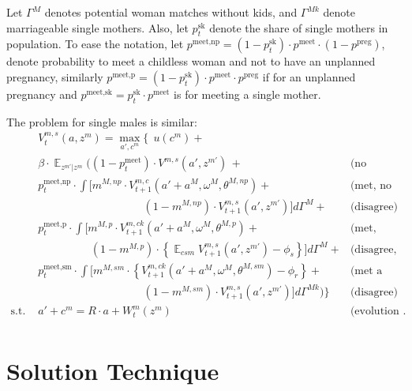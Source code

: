 \documentclass[12pt,letter]{article}
\DeclareMathOperator{\E}{\mathbb{E}}
\begin{document}
Let $\Gamma^M$ denotes potential woman matches without kids, and $\Gamma^{Mk}$ denote marriageable single mothers. Also, let $p^{\text{sk}}_t$ denote the share of single mothers in population. To ease the notation, let $p^{\text{meet,np}} = (1-p^{\text{sk}}_t)\cdot p^{\text{meet}} \cdot (1-p^{\text{preg}})$, denote probability to meet a childless woman and not to have an unplanned pregnancy, similarly $p^{\text{meet,p}} = (1-p^{\text{sk}}_t)\cdot p^{\text{meet}} \cdot p^{\text{preg}}$ if for an unplanned pregnancy and $p^{\text{meet,sk}} = p^{\text{sk}}_t\cdot p^{\text{meet}}$ is for meeting a single mother.

The problem for single males is similar:
\begin{align}\label{singlemaleproblem} & V_t^{m,s}(a,z^m)  = \max\limits_{a',c^m} \Bigg\{ \ \ u(c^m) +  \\\nonumber &  \beta\cdot \E_{z^{m\prime}|z^m} \Bigg( (1-p^{\text{meet}}_t)\cdot V^{m,s}(a',z^{m\prime}) \,+ & \text{(no partner met)}\\\nonumber
 & p^{\text{meet,np}}_t \cdot \int \Big[m^{M,np}\cdot V^{m,c}_{t+1}(a'+a^M,\omega^M,\theta^{M,np}) + & \text{(met, no pregnancy, agree)}\\\nonumber
 &\hspace{4cm}(1-m^{M,np})\cdot V^{m,s}_{t+1}(a',z^{m\prime}) \Big]d\Gamma^M + & \text{(disagree)} \\\nonumber
 & p^{\text{meet,p}}_t \cdot \int \Big[m^{M,p}\cdot V^{m,ck}_{t+1}(a'+a^M,\omega^M,\theta^{M,p})+  & \text{(met, shotgun marriage)}\\\nonumber
 &\hspace{2cm} (1-m^{M,p})\cdot \left\{\E_{csm}V^{m,s}_{t+1}(a',z^{m\prime}) - \phi_s\right\} \Big]d\Gamma^M + & \text{(disagree, social stigma)}\\\nonumber
 & p^{\text{meet,sm}}_t \cdot \int \Big[m^{M,sm}\cdot \left\{ V^{m,ck}_{t+1}(a'+a^M,\omega^M,\theta^{M,sm}) - \phi_r\right\}+  & \text{(met a single mother)}\\\nonumber
 &\hspace{4cm} (1-m^{M,sm})\cdot  V^{m,s}_{t+1}(a',z^{m\prime}) \Big]d\Gamma^{Mk}\Bigg) \Bigg\} & \text{(disagree)}\\\nonumber
 \text{s.t. \ } & a' + c^m = R\cdot a  + W^m_t(z^m) & \text{(evolution of the assets)}.\\\nonumber
\end{align}

\section{Solution Technique\label{solution-appendix}}
\end{document}
